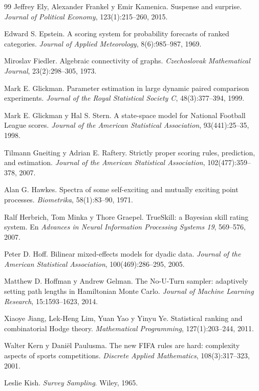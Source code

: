\begin{thebibliography}{99}
 Jeffrey Ely, Alexander Frankel y Emir Kamenica. Suspense and surprise. \emph{Journal of Political Economy}, 123(1):215--260, 2015.

 Edward S. Epstein. A scoring system for probability forecasts of ranked categories. \emph{Journal of Applied Meteorology}, 8(6):985--987, 1969.

 Miroslav Fiedler. Algebraic connectivity of graphs. \emph{Czechoslovak Mathematical Journal}, 23(2):298--305, 1973.

 Mark E. Glickman. Parameter estimation in large dynamic paired comparison experiments. \emph{Journal of the Royal Statistical Society C}, 48(3):377--394, 1999.

 Mark E. Glickman y Hal S. Stern. A state-space model for National Football League scores. \emph{Journal of the American Statistical Association}, 93(441):25--35, 1998.

 Tilmann Gneiting y Adrian E. Raftery. Strictly proper scoring rules, prediction, and estimation. \emph{Journal of the American Statistical Association}, 102(477):359--378, 2007.

 Alan G. Hawkes. Spectra of some self-exciting and mutually exciting point processes. \emph{Biometrika}, 58(1):83--90, 1971.

 Ralf Herbrich, Tom Minka y Thore Graepel. TrueSkill: a Bayesian skill rating system. En \emph{Advances in Neural Information Processing Systems 19}, 569--576, 2007.

 Peter D. Hoff. Bilinear mixed-effects models for dyadic data. \emph{Journal of the American Statistical Association}, 100(469):286--295, 2005.

 Matthew D. Hoffman y Andrew Gelman. The No-U-Turn sampler: adaptively setting path lengths in Hamiltonian Monte Carlo. \emph{Journal of Machine Learning Research}, 15:1593--1623, 2014.

 Xiaoye Jiang, Lek-Heng Lim, Yuan Yao y Yinyu Ye. Statistical ranking and combinatorial Hodge theory. \emph{Mathematical Programming}, 127(1):203--244, 2011.

 Walter Kern y Daniël Paulusma. The new FIFA rules are hard: complexity aspects of sports competitions. \emph{Discrete Applied Mathematics}, 108(3):317--323, 2001.

 Leslie Kish. \emph{Survey Sampling}. Wiley, 1965.


\end{thebibliography}
